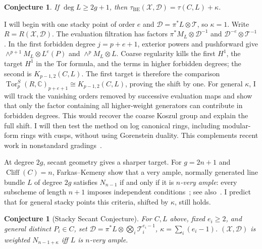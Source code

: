 \documentclass[11pt,reqno]{amsart}
\newtheorem{conjecture}[lemma]{Conjecture}
\theoremstyle{remark}
\newcommand{\Tor}{\operatorname{Tor}}
\newcommand{\cliff}{\operatorname{Cliff}}
\newcommand{\BE}{\operatorname{BE}}
\newcommand{\CC}{\mathbb{C}}
\newcommand{\cD}{\mathcal{D}}
\newcommand{\cT}{\mathcal{T}}
\newcommand{\cX}{\mathcal{X}}
\begin{document}
\begin{conjecture}\label{conj:high-degree}
If $\deg L\geq2g+1$, then $\tau_{\BE}(\cX,\cD)=\tau(C,L)+\kappa$.
\end{conjecture}
I will begin with one stacky point of order $e$ and $\cD=\pi^*L\otimes\cT$, so $\kappa=1$. Write $R=R(\cX,\cD)$. The evaluation filtration has factors $\pi^*M_L\otimes\cD^{-1}$ and $\cD^{-e}\otimes\cT^{-1}$. In the first forbidden degree $j=p+e+1$, exterior powers and pushforward give $\wedge^{p+1}M_L\otimes L^e(P)$ and $\wedge^pM_L\otimes L$. Coarse regularity kills the first $H^1$, the target $H^1$ in the Tor formula, and the terms in higher forbidden degrees; the second is $K_{p-1,2}(C,L)$. The first target is therefore the comparison $\Tor_p^S(R,\CC)_{p+e+1}\cong K_{p-1,2}(C,L)$, proving the shift by one. For general $\kappa$, I will track the vanishing orders removed by successive evaluation maps and show that only the factor containing all higher-weight generators can contribute in forbidden degrees. This would recover the coarse Koszul group and explain the full shift. I will then test the method on log canonical rings, including modular-form rings with cusps, without using Gorenstein duality. This complements recent work in nonstandard gradings~\cite{brownErman24-2,brownErmanStrands24,banksCobbSayrafi26,martinova25,DB25}. 

At degree $2g$, secant geometry gives a sharper target. For $g=2n+1$ and $\cliff(C)=n$, Farkas--Kemeny show that a very ample, normally generated line bundle $L$ of degree $2g$ satisfies $N_{n-1}$ if and only if it is \emph{$n$-very ample}: every subscheme of length $n+1$ imposes independent conditions~\cite[Thm.~1.4]{farkasKemeny16}; see also~\cite{farkasDifference24}. I predict that for general stacky points this criteria, shifted by $\kappa$, still holds. 

\begin{conjecture}[Stacky Secant Conjecture]\label{conj:weighted-secant}
For $C,L$ above, fixed $e_i\ge2$, and general distinct
$P_i\in C$, set $\cD=\pi^*L\otimes\bigotimes_i\cT_i^{e_i-1}$,
$\kappa=\sum_i(e_i-1)$. $(\cX,\cD)$ is weighted
$N_{n-1+\kappa}$ iff $L$ is $n$-very ample.
\end{conjecture}
\end{document}
